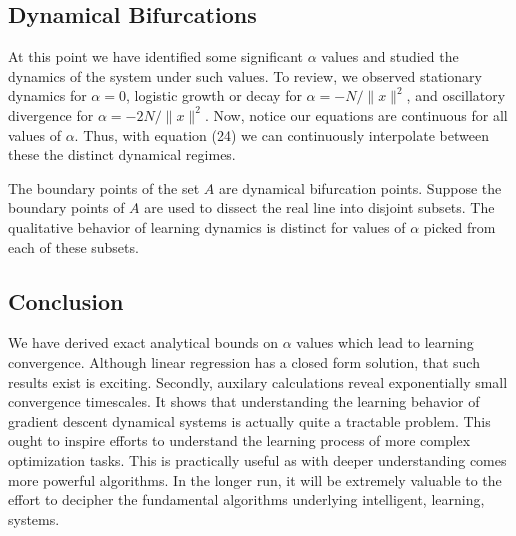 \documentclass[]{article}
\begin{document}
\subsection{Dynamical Bifurcations}\label{dynamical-bifurcations}

At this point we have identified some significant \(\alpha\) values and
studied the dynamics of the system under such values. To review, we
observed stationary dynamics for \(\alpha=0\), logistic growth or decay
for \(\alpha = -N/{\| x \|^2}\), and oscillatory divergence for
\(\alpha = -2N/{\|x\|^2}\). Now, notice our equations are continuous for
all values of \(\alpha\). Thus, with equation (24) we can continuously
interpolate between these the distinct dynamical regimes.

The boundary points of the set \(A\) are dynamical bifurcation points.
Suppose the boundary points of \(A\) are used to dissect the real line
into disjoint subsets. The qualitative behavior of learning dynamics is
distinct for values of \(\alpha\) picked from each of these subsets.

\subsection{Conclusion}\label{conclusion}

We have derived exact analytical bounds on \(\alpha\) values which lead
to learning convergence. Although linear regression has a closed form
solution, that such results exist is exciting. Secondly, auxilary
calculations reveal exponentially small convergence timescales. It shows
that understanding the learning behavior of gradient descent dynamical
systems is actually quite a tractable problem. This ought to inspire
efforts to understand the learning process of more complex optimization
tasks. This is practically useful as with deeper understanding comes
more powerful algorithms. In the longer run, it will be extremely
valuable to the effort to decipher the fundamental algorithms underlying
intelligent, learning, systems.
\end{document}
